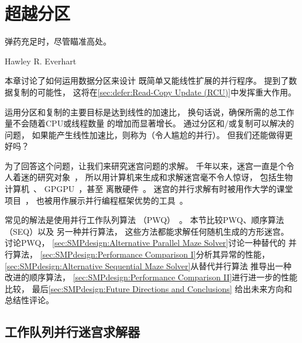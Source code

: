 
\section{超越分区}
\label{sec:SMPdesign:Beyond Partitioning}
%
\epigraph{弹药充足时，尽管瞄准高处。}
	 {Hawley R. Everhart}

本章讨论了如何运用数据分区来设计
既简单又能线性扩展的并行程序。
提到了数据复制的可能性，
这将在\cref{sec:defer:Read-Copy Update (RCU)}中发挥重大作用。

运用分区和复制的主要目标是达到线性的加速比，
换句话说，确保所需的总工作量不会随着CPU或线程数量
的增加而显著增长。
通过分区和/或复制可以解决的问题，
如果能产生线性加速比，则称为\emph{}（令人尴尬的并行）。
但我们还能做得更好吗？

为了回答这个问题，让我们来研究迷宫问题的求解。
千年以来，迷宫一直是个令人着迷的研究对象~\cite{WikipediaLabyrinth}，
所以用计算机来生成和求解迷宫毫不令人惊讶，
包括生物计算机~\cite{AndrewAdamatzky2011SlimeMold}、
GPGPU~\cite{ChristerEricson2008GPUMaze}，甚至
离散硬件~\cite{MIT:TRMag:MemristorMazes}。
迷宫的并行求解有时被用作大学的课堂项目~\cite{ETHZurich:FS2011maze,UMD:CMSC433maze}，
也被用作展示并行编程框架优势的工具~\cite{RonFosner2010maze}。

常见的解法是使用并行工作队列算法
（PWQ）~\cite{ETHZurich:FS2011maze,RonFosner2010maze}。
本节比较PWQ、顺序算法（SEQ）以及
另一种并行算法，
这些方法都能求解任何随机生成的方形迷宫。
讨论PWQ，
\cref{sec:SMPdesign:Alternative Parallel Maze Solver}讨论一种替代的
并行算法，
\cref{sec:SMPdesign:Performance Comparison I}分析其异常的性能，
\cref{sec:SMPdesign:Alternative Sequential Maze Solver}从替代并行算法
推导出一种改进的顺序算法，
\cref{sec:SMPdesign:Performance Comparison II}进行进一步的性能比较，
最后\cref{sec:SMPdesign:Future Directions and Conclusions}
给出未来方向和总结性评论。

\subsection{工作队列并行迷宫求解器}
\label{sec:SMPdesign:Work-Queue Parallel Maze Solver}

